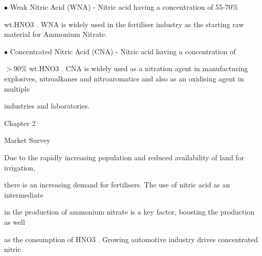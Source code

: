 \documentclass[a4paper,portrait,12pt]{article}
\begin{document}
\begin{flushleft}
$\bullet$ Weak Nitric Acid (WNA) - Nitric acid having a concentration of 55-70\%
\end{flushleft}


\begin{flushleft}
wt.HNO3 . WNA is widely used in the fertiliser industry as the starting raw material for Ammonium Nitrate.
\end{flushleft}


\begin{flushleft}
$\bullet$ Concentrated Nitric Acid (CNA) - Nitric acid having a concentration of
\end{flushleft}


\begin{flushleft}
$>$90\% wt.HNO3 . CNA is widely used as a nitration agent in manufacturing explosives, nitroalkanes and nitroaromatics and also as an oxidising agent in multiple
\end{flushleft}


\begin{flushleft}
industries and laboratories.
\end{flushleft}





\begin{flushleft}
\newpage
Chapter 2
\end{flushleft}





\begin{flushleft}
Market Survey
\end{flushleft}


\begin{flushleft}
Due to the rapidly increasing population and reduced availability of land for irrigation,
\end{flushleft}


\begin{flushleft}
there is an increasing demand for fertilisers. The use of nitric acid as an intermediate
\end{flushleft}


\begin{flushleft}
in the production of ammonium nitrate is a key factor, boosting the production as well
\end{flushleft}


\begin{flushleft}
as the consumption of HNO3 . Growing automotive industry drives concentrated nitric
\end{flushleft}
\end{document}
